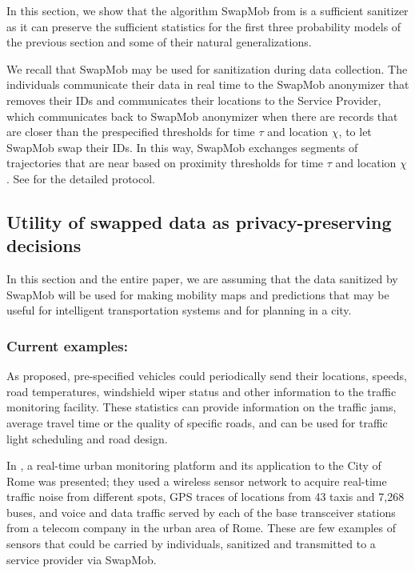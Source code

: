 \documentclass[times,twocolumn,final,authoryear]{elsarticle}
\begin{document}
In this section, we show that the algorithm SwapMob from \cite{Salas:2018-c} is a sufficient sanitizer as it can preserve the sufficient statistics for the first three probability models of the previous section and some of their natural generalizations.

We recall that SwapMob may be used for sanitization during data collection.
The individuals communicate their data in real time to the SwapMob anonymizer that removes their IDs and communicates their locations to the Service Provider, which communicates back to SwapMob anonymizer when there are records that are closer than the prespecified thresholds for time $\tau$ and location $\chi$, to let SwapMob swap their IDs.
In this way, SwapMob exchanges segments of trajectories that are near based on proximity thresholds for time $\tau$ and location $\chi$. See \cite{Salas:2018-c} for the detailed protocol.

\subsection{Utility of swapped data as privacy-preserving decisions}\label{sect:util}
In this section and the entire paper, we are assuming that the data sanitized by SwapMob will be used for making mobility maps and predictions that may be useful for intelligent transportation systems and for planning in a city.


\subsubsection{Current examples:}
As \cite{Hoh2005} proposed, pre-specified vehicles could periodically send their locations, speeds, road temperatures, windshield wiper status and other information to the traffic monitoring facility. These statistics can provide information on the traffic jams, average travel time or the quality of specific roads, and can be used for traffic light scheduling and road design.


In \cite{Calabrese2011}, a real-time urban monitoring platform and its application to the City of Rome was presented; they used
a wireless sensor network to acquire real-time traffic noise from different spots, GPS traces of locations from 43 taxis and 7,268 buses, and voice and data traffic served by each of the base transceiver stations from a telecom company in the urban area of Rome. These are few examples of sensors that could be carried by individuals, sanitized and transmitted to a service provider via SwapMob.
\end{document}
